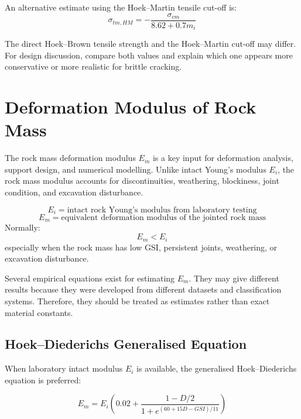 \documentclass[a4paper,12pt]{article}
\begin{document}
An alternative estimate using the Hoek--Martin tensile cut-off is:
\[
\sigma_{tm,HM}
=
-\frac{\sigma_{cm}}{8.62+0.7m_i}
\]

\begin{notebox}
The direct Hoek--Brown tensile strength and the Hoek--Martin cut-off may differ.
For design discussion, compare both values and explain which one appears more conservative
or more realistic for brittle cracking.
\end{notebox}

\section{Deformation Modulus of Rock Mass}

The rock mass deformation modulus \(E_m\) is a key input for deformation analysis,
support design, and numerical modelling. Unlike intact Young's modulus \(E_i\), the
rock mass modulus accounts for discontinuities, weathering, blockiness, joint condition,
and excavation disturbance.

\begin{keybox}
\[
E_i = \text{intact rock Young's modulus from laboratory testing}
\]
\[
E_m = \text{equivalent deformation modulus of the jointed rock mass}
\]
Normally:
\[
E_m < E_i
\]
especially when the rock mass has low GSI, persistent joints, weathering, or excavation
disturbance.
\end{keybox}

Several empirical equations exist for estimating \(E_m\). They may give different results
because they were developed from different datasets and classification systems. Therefore,
they should be treated as estimates rather than exact material constants.

\subsection{Hoek--Diederichs Generalised Equation}

When laboratory intact modulus \(E_i\) is available, the generalised Hoek--Diederichs
equation is preferred:

\[
E_m =
E_i
\left(
0.02+
\frac{1-D/2}
{1+e^{(60+15D-GSI)/11}}
\right)
\]
\end{document}
